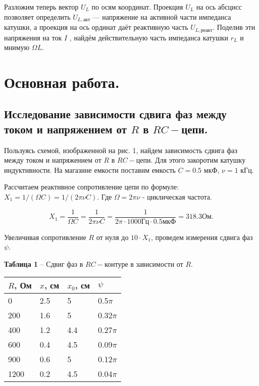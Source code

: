 \documentclass[12pt,a4paper]{article}
\begin{document}
        Разложим теперь вектор $U_L$ по осям координат. Проекция $U_L$ на ось абсцисс позволяет определить $U_{L,\text{акт}}$  — напряжение на активной части импеданса катушки, а проекция на ось ординат даёт реактивную часть $U_{L,\text{реакт}}$. Поделив эти напряжения на ток $I$ , найдём действительную часть импеданса катушки $r_L$ и мнимую $\Omega L$.

\newpage
\section{Основная работа.}
    \subsection{Исследование зависимости сдвига фаз между током и напряжением от $R$ в $RC-$цепи.}
        Пользуясь схемой, изображенной на рис. 1, найдем зависимость сдвига фаз между током и напряжением от $R$ в $RC-$цепи. Для этого закоротим катушку индуктивности. На магазине емкости поставим емкость $C = 0.5$ мкФ, $\nu = 1$ кГц.
        
        Рассчитаем реактивное сопротивление цепи по формуле: $X_1 = 1/(\Omega C) = 1/(2 \pi \nu C)$. Где $\Omega = 2 \pi \nu$ - циклическая частота.
        
        \[
        X_1 = \frac{1}{\Omega C} = \frac{1}{2 \pi \nu C} = \frac{1}{2 \pi \cdot 1000 \text{Гц} \cdot 0.5 \text{мкФ}} = 318.3 \text{Ом}.
        \]
        
        Увеличивая сопротивление $R$ от нуля до $10 \cdot X_1$, проведем измерения сдвига фаз $\psi$.
        
        \begin{table}[!h]
        \begin{flushleft}
       		\hspace{80}\textbf{Таблица 1} -- Сдвиг фаз в $RC-$контуре в зависимости от  $R$.\\
        \end{flushleft}
            \begin{center}
                \begin{tabular}{ | l | l | l | l |}
                    \hline
                    $R$, Ом &   $x$, см &  $x_0$, см &   $\psi$  \\
                    \hline
                    0   &   2.5 &   5   &   0.5$\pi$\\
                    200 &   1.6 &   5   &   0.32$\pi$\\
                    400 &   1.2 &   4.4 &   0.27$\pi$\\
                    600 &   0.4 &   4.5 &   0.09$\pi$\\
                    900 &   0.6 &   5   &   0.12$\pi$\\
                    1200&   0.2 &   4.5 &   0.04$\pi$\\
                    \hline                
                \end{tabular}
            \end{center}
        \end{table}
            
\end{document}
